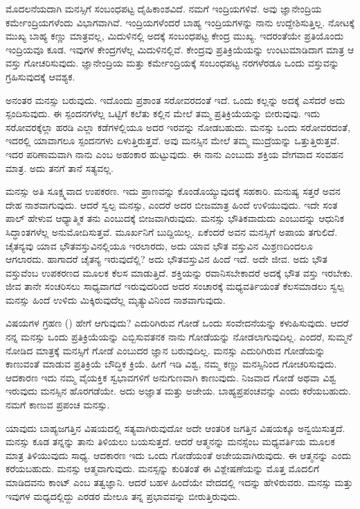 ಮೊದಲನೆಯದಾಗಿ ಮನಸ್ಸಿಗೆ ಸಂಬಂಧಪಟ್ಟ ದೈಹಿಕಾಂಶವಿದೆ. ನಮಗೆ ಇಂದ್ರಿಯಗಳಿವೆ. ಅವು ಜ್ಞಾನೇಂದ್ರಿಯ ಕರ್ಮೇಂದ್ರಿಯಗಳೆಂದು ವಿಭಾಗವಾಗಿವೆ. ಇಂದ್ರಿಯಗಳೆಂದರೆ ಬಾಹ್ಯ ಇಂದ್ರಿಯಗಳನ್ನು ನಾನು ಉದ್ದೇಶಿಸುತ್ತಿಲ್ಲ. ನೋಟಕ್ಕೆ ಮುಖ್ಯ ಬಾಹ್ಯ ಕಣ್ಣು ಮಾತ್ರವಲ್ಲ, ಮಿದುಳಿನಲ್ಲಿ ಅದಕ್ಕೆ ಸಂಬಂಧಪಟ್ಟ ಕೇಂದ್ರ ಮುಖ್ಯ. ಇದರಂತೆಯೇ ಪ್ರತಿಯೊಂದು ಇಂದ್ರಿಯವೂ ಕೂಡ. ಇವುಗಳ ಕೇಂದ್ರಗಳೆಲ್ಲ ಮಿದುಳಿನಲ್ಲಿವೆ. ಕೇಂದ್ರವು ಪ್ರತಿಕ್ರಿಯೆಯನ್ನು ಉಂಟುಮಾಡಿದಾಗ ಮಾತ್ರ ಆ ವಸ್ತು ಗೋಚರಿಸುವುದು. ಜ್ಞಾನೇಂದ್ರಿಯ ಮತ್ತು ಕರ್ಮೇಂದ್ರಿಯಕ್ಕೆ ಸಂಬಂಧಪಟ್ಟ ನರಗಳೆರಡೂ ಒಂದು ವಸ್ತುವನ್ನು ಗ್ರಹಿಸುವುದಕ್ಕೆ ಆವಶ್ಯಕ.

ಅನಂತರ ಮನಸ್ಸು ಬರುವುದು. ಇದೊಂದು ಪ್ರಶಾಂತ ಸರೋವರದಂತೆ ಇದೆ. ಒಂದು ಕಲ್ಲನ್ನು ಅದಕ್ಕೆ ಎಸೆದರೆ ಅದು ಸ್ಪಂದಿಸುವುದು. ಈ ಸ್ಪಂದನಗಳೆಲ್ಲ ಒಟ್ಟಿಗೆ ಕಲೆತು ಕಲ್ಲಿನ ಮೇಲೆ ತಮ್ಮ ಪ್ರತಿಕ್ರಿಯೆಯನ್ನು ಬೀರುವುವು. ಇದು ಸರೋವರಕ್ಕೆಲ್ಲಾ ಹರಡಿ ಎಲ್ಲಾ ಕಡೆಗಳಲ್ಲಿಯೂ ಅದರ ಇರವನ್ನು ನೋಡಬಹುದು. ಮನಸ್ಸು ಒಂದು ಸರೋವರದಂತೆ, ಇದರಲ್ಲಿ ಯಾವಾಗಲೂ ಸ್ಪಂದನಗಳು ಏಳುತ್ತಿರುತ್ತವೆ. ಅವು ಮನಸ್ಸಿನ ಮೇಲೆ ತಮ್ಮ ಮುದ್ರೆಯನ್ನು ಒತ್ತುತ್ತಿರುತ್ತವೆ. ಇದರ ಪರಿಣಾಮವಾಗಿ ನಾನು ಎಂಬ ಅಹಂಕಾರ ಹುಟ್ಟುವುದು. ಈ ನಾನು ಎಂಬುದು ಶಕ್ತಿಯ ವೇಗವಾದ ಸಂವಹನ ಮಾತ್ರ. ಅದು ತನಗೆ ತಾನೆ ಸತ್ಯವಲ್ಲ.

ಮನಸ್ಸು ಅತಿ ಸೂಕ್ಷ್ಮವಾದ ಉಪಕರಣ. ಇದು ಪ್ರಾಣವನ್ನು ಕೊಂಡೊಯ್ಯುವುದಕ್ಕೆ ಸಹಕಾರಿ. ಮನುಷ್ಯ ಸತ್ತರೆ ಅವನ ದೇಹ ನಾಶವಾಗುವುದು. ಆದರೆ ಸ್ವಲ್ಪ ಮನಸ್ಸು, ಎಂದರೆ ಅದರ ಬೀಜಮಾತ್ರ ಹಿಂದೆ ಉಳಿಯುವುದು. ಇದೇ ಸಂತ ಪಾಲ್ ಹೇಳುವ ಆಧ್ಯಾತ್ಮಿಕ ತನು ಎಂಬುದಕ್ಕೆ ಬೀಜವಾಗಿರುವುದು. ಮನಸ್ಸು ಭೌತಿಕವಾದುದು ಎಂಬುದನ್ನು ಆಧುನಿಕ ಸಿದ್ಧಾಂತಗಳೆಲ್ಲ ಅನುಮೋದಿಸುತ್ತವೆ. ಮೂರ್ಖನಿಗೆ ಬುದ್ದಿಯಿಲ್ಲ. ಏಕೆಂದರೆ ಅವನ ಮನಸ್ಸಿಗೆ ಅಪಾಯ ತಗುಲಿದೆ. ಚೈತನ್ಯವು ಯಾವ ಭೌತವಸ್ತುವಿನಲ್ಲಿಯೂ ಇರಲಾರದು, ಅದು ಯಾವ ಭೌತ ವಸ್ತುವಿನ ಮಿಶ್ರಣದಿಂದಲೂ ಆಗಲಾರದು. ಹಾಗಾದರೆ ಚೈತನ್ಯ ಇರುವುದೆಲ್ಲಿ? ಅದು ಭೌತವಸ್ತುವಿನ ಹಿಂದೆ ಇದೆ. ಅದೇ ಜೀವ. ಅದು ಭೌತ ವಸ್ತುವೆಂಬ ಉಪಕರಣದ ಮೂಲಕ ಕೆಲಸ ಮಾಡುತ್ತಿದೆ. ಶಕ್ತಿಯನ್ನು ರವಾನಿಸಬೇಕಾದರೆ ಅದಕ್ಕೆ ಭೌತ ವಸ್ತು ಇರಬೇಕು. ಜೀವ ತಾನೇ ಸಂಚರಿಸಲು ಸಾಧ್ಯವಾಗದೆ ಇರುವುದರಿಂದ ಅದರ ಸಂಚಾರಕ್ಕೆ ಮಧ್ಯವರ್ತಿಯಂತೆ ಕೆಲಸಮಾಡಲು ಸ್ವಲ್ಪ ಮನಸ್ಸು ಹಿಂದೆ ಉಳಿದು ಮಿಕ್ಕಿರುವುದೆಲ್ಲ ಮೃತ್ಯುವಿನಿಂದ ನಾಶವಾಗುವುದು.

ವಿಷಯಗಳ ಗ್ರಹಣ () ಹೇಗೆ ಆಗುವುದು? ಎದುರಿಗಿರುವ ಗೋಡೆ ಒಂದು ಸಂವೇದನೆಯನ್ನು ಕಳುಹಿಸುವುದು. ಆದರೆ ನನ್ನ ಮನಸ್ಸು ಒಂದು ಪ್ರತಿಕ್ರಿಯೆಯನ್ನು ಎಬ್ಬಿಸುವತನಕ ನಾನು ಗೋಡೆಯನ್ನು ನೋಡಲಾಗುವುದಿಲ್ಲ. ಎಂದರೆ, ಸುಮ್ಮನೆ ನೋಡಿದ ಮಾತ್ರಕ್ಕೆ ಮನಸ್ಸಿಗೆ ಗೋಡೆ ಎಂಬುದರ ಜ್ಞಾನ ಬರುವುದಿಲ್ಲ. ಮನಸ್ಸು ಎದುರಿಗಿರುವ ಗೋಡೆಯನ್ನು ಕಾಣುವಂತೆ ಮಾಡುವ ಪ್ರತಿಕ್ರಿಯೆ ಬೌದ್ಧಿಕ ಕ್ರಿಯೆ. ಹೀಗೆ ಇಡಿ ವಿಶ್ವ, ನಮ್ಮ ಕಣ್ಣು ಮನಸ್ಸಿನಿಂದ ಗೋಚರಿಸುವುದು. ಆದಕಾರಣ ಇದು ನಮ್ಮ ವೈಯಕ್ತಿಕ ಸ್ವಭಾವಗಳಿಗೆ ಅನುಗುಣವಾಗಿ ಕಾಣುವುದು. ನಿಜವಾದ ಗೋಡೆ ಅಥವಾ ವಿಶ್ವ ಇರುವುದು ಮನಸ್ಸಿನ ಹೊರಗಡೆಯೇ. ಅದು ಅಜ್ಞಾತ ಮತ್ತು ಅಜೇಯ. ಬಾಹ್ಯಪ್ರಪಂಚವನ್ನು  ಎಂದು ಕರೆಯಬಹುದು. ನಮಗೆ ಕಾಣುವ ಪ್ರಪಂಚ  ಮನಸ್ಸು.

ಯಾವುದು ಬಾಹ್ಯಜಗತ್ತಿನ ವಿಷಯದಲ್ಲಿ ಸತ್ಯವಾಗಿರುವುದೋ ಅದೇ ಆಂತರಿಕ ಜಗತ್ತಿನ ವಿಷಯಕ್ಕೂ ಅನ್ವಯಿಸುತ್ತದೆ. ಮನಸ್ಸು ಕೂಡ ತನ್ನನ್ನು ತಾನು ತಿಳಿಯಲು ಬಯಸುತ್ತದೆ. ಆದರೆ ಆತ್ಮನನ್ನು ಮನಸ್ಸೆಂಬ ಮಧ್ಯವರ್ತಿಯ ಮೂಲಕ ಮಾತ್ರ ತಿಳಿಯುವುದು ಸಾಧ್ಯ. ಆದಕಾರಣ ಇದು ಒಂದು ಗೋಡೆಯಂತೆ ಅಜೇಯವಾಗಿರುವುದು. ಈ ಆತ್ಮನನ್ನು  ಎಂದು ಕರೆಯಬಹುದು.  ಮನಸ್ಸು ಆತ್ಮವಾಗುವುದು. ಮನಸ್ಸನ್ನು ಕುರಿತಂತೆ ಈ ವಿಶ್ಲೇಷಣೆಯನ್ನು ಮೊತ್ತ ಮೊದಲಿಗೆ ಮಾಡಿದವನು ಕಾಂಟ್ ಎಂಬ ತತ್ವಜ್ಞಾನಿ. ಆದರೆ ಬಹಳ ಹಿಂದೆಯೇ ವೇದದಲ್ಲಿ ಇದನ್ನು ಹೇಳಿರುವರು. ಮನಸ್ಸು  ಮತ್ತು  ಇವುಗಳ ಮಧ್ಯದಲ್ಲಿದ್ದು ಎರಡರ ಮೇಲೂ ತನ್ನ ಪ್ರಭಾವವನ್ನು ಬೀರುತ್ತಿರುವುದು.

